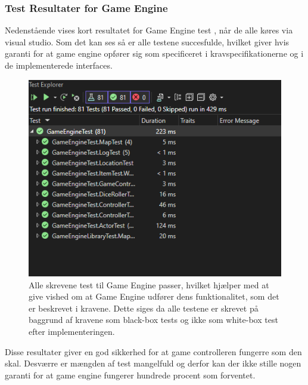 \subsubsection{Test Resultater for Game Engine}
Nedenstående vises kort resultatet for Game Engine test \parencite[Section 10.2.3][]{TekniskBilag}, når de alle køres via visual
studio. Som det kan ses så er alle testene succesfulde, hvilket giver hvis garanti for at
game engine opfører sig som specificeret i kravspecifikationerne og i de implementerede interfaces.

\begin{figure}[H]
  \centering
  \includegraphics[scale=0.4]{02-body/Images/Test Results.png}
    \caption{Alle skrevene test til Game Engine passer, hvilket hjælper med at give vished
          om at Game Engine udfører dens funktionalitet, som det er beskrevet i kravene.
          Dette siges da alle testene er skrevet på baggrund af kravene som black-box tests
          og ikke som white-box test efter implementeringen.}
  \label{fig:TestResultsGameEngine}
\end{figure}

\noindent Disse resultater giver en god sikkerhed for at game controlleren fungerre som den skal. Desværre er 
mængden af test mangelfuld og derfor kan der ikke stille nogen garanti for at game engine fungerer hundrede procent
som forventet.

